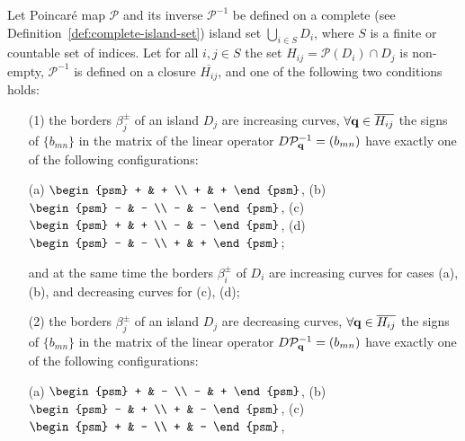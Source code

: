 \begin{theorem*}
	Let Poincar\'e map $\mathcal{P}$ and its inverse $\mathcal{P}^{-1}$ be defined on a complete (see Definition~\ref{def:complete-island-set}) island set $\bigcup_{i \in S} D_i$, where $S$ is a finite or countable set of indices.
	Let for all $i, j \in S$ the set $H_{ij} = \mathcal{P} (D_i) \cap D_j$ is non-empty, $\mathcal{P}^{-1}$ is defined on a
	 closure $\overline{H_{ij}}$, and one of the following two conditions holds:
	\begin{enumerate}
		\item[(1)] the borders $\beta_j^{\pm}$ of an island $D_j$ are increasing curves, $\forall \vb{q} \in \overline{H_{ij}}$ the signs of $\{ b_{mn} \}$ in the matrix of the linear operator $D \mathcal{P}_{\vb{q}}^{-1} = (b_{mn})$ have exactly one of the following configurations:
			\begin{center}
				(a) $\begin{psm} + & + \\ + & + \end{psm}$, \quad
				(b) $\begin{psm} - & - \\ - & - \end{psm}$, \quad
				(c) $\begin{psm} + & + \\ - & - \end{psm}$, \quad
				(d) $\begin{psm} - & - \\ + & + \end{psm}$;
			\end{center}
			and at the same time the borders $\beta_i^{\pm}$ of $D_i$ are increasing curves for cases (a), (b), and decreasing curves for (c), (d);
		\item[(2)] the borders $\beta_j^{\pm}$ of an island $D_j$ are decreasing curves, $\forall \vb{q} \in \overline{H	_{ij}}$ the signs of $\{ b_{mn} \}$ in the matrix of the linear operator $D \mathcal{P}_{\vb{q}}^{-1} = (b_{mn})$ have exactly one of the following configurations:
			\begin{center}
				(a) $\begin{psm} + & - \\ - & + \end{psm}$, \quad
				(b) $\begin{psm} - & + \\ + & - \end{psm}$,	\quad
				(c) $\begin{psm} + & - \\ + & - \end{psm}$, \quad

\end{center}
\end{enumerate}
\end{theorem*}
